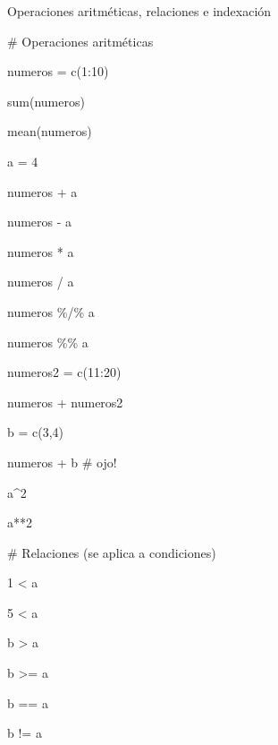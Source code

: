 \documentclass[
  spanish,
  letterpaper,
  DIV=11,
  numbers=noendperiod]{scrreprt}
\newenvironment{Shaded}{\begin{snugshade}}{\end{snugshade}}
\newcommand{\CommentTok}[1]{\textcolor[rgb]{0.37,0.37,0.37}{#1}}
\newcommand{\DecValTok}[1]{\textcolor[rgb]{0.68,0.00,0.00}{#1}}
\newcommand{\FunctionTok}[1]{\textcolor[rgb]{0.28,0.35,0.67}{#1}}
\newcommand{\NormalTok}[1]{\textcolor[rgb]{0.00,0.23,0.31}{#1}}
\newcommand{\OtherTok}[1]{\textcolor[rgb]{0.00,0.23,0.31}{#1}}
\newcommand{\SpecialCharTok}[1]{\textcolor[rgb]{0.37,0.37,0.37}{#1}}
\begin{document}
Operaciones aritméticas, relaciones e indexación

\begin{Shaded}
\begin{Highlighting}[]

\CommentTok{\# Operaciones aritméticas}

\NormalTok{numeros }\OtherTok{=} \FunctionTok{c}\NormalTok{(}\DecValTok{1}\SpecialCharTok{:}\DecValTok{10}\NormalTok{)}

\FunctionTok{sum}\NormalTok{(numeros)}

\FunctionTok{mean}\NormalTok{(numeros)}

\NormalTok{a }\OtherTok{=} \DecValTok{4}

\NormalTok{numeros }\SpecialCharTok{+}\NormalTok{ a}

\NormalTok{numeros }\SpecialCharTok{{-}}\NormalTok{ a}

\NormalTok{numeros }\SpecialCharTok{*}\NormalTok{ a}

\NormalTok{numeros }\SpecialCharTok{/}\NormalTok{ a}

\NormalTok{numeros }\SpecialCharTok{\%/\%}\NormalTok{ a}

\NormalTok{numeros }\SpecialCharTok{\%\%}\NormalTok{ a}

\NormalTok{numeros2 }\OtherTok{=} \FunctionTok{c}\NormalTok{(}\DecValTok{11}\SpecialCharTok{:}\DecValTok{20}\NormalTok{)}

\NormalTok{numeros }\SpecialCharTok{+}\NormalTok{ numeros2}

\NormalTok{b }\OtherTok{=} \FunctionTok{c}\NormalTok{(}\DecValTok{3}\NormalTok{,}\DecValTok{4}\NormalTok{)}

\NormalTok{numeros }\SpecialCharTok{+}\NormalTok{ b }\CommentTok{\# ojo!}

\NormalTok{a}\SpecialCharTok{\^{}}\DecValTok{2}

\NormalTok{a}\SpecialCharTok{**}\DecValTok{2}

\CommentTok{\# Relaciones (se aplica a condiciones)}

\DecValTok{1} \SpecialCharTok{\textless{}}\NormalTok{ a}

\DecValTok{5} \SpecialCharTok{\textless{}}\NormalTok{ a}

\NormalTok{b }\SpecialCharTok{\textgreater{}}\NormalTok{ a}

\NormalTok{b }\SpecialCharTok{\textgreater{}=}\NormalTok{ a}

\NormalTok{b }\SpecialCharTok{==}\NormalTok{ a}

\NormalTok{b }\SpecialCharTok{!=}\NormalTok{ a}


\end{Highlighting}
\end{Shaded}
\end{document}
